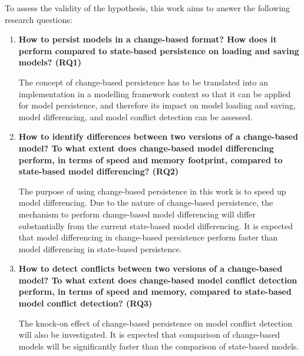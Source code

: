To assess the validity of the hypothesis, this work aims to answer the following research questions: 
\begin{enumerate} 
\item \textbf{How to persist models in a change-based format? How does it perform compared to state-based persistence on loading and saving models? (RQ1)} 

The concept of change-based persistence has to be translated into an implementation in a modelling framework context so that it can be applied for model persistence, and therefore its impact on model loading and saving, model differencing, and model conflict detection can be assessed.

\item \textbf{How to identify differences between two versions of a change-based model? To what extent does change-based model differencing perform, in terms of speed and memory footprint, compared to state-based model differencing? (RQ2)} 

The purpose of using change-based persistence in this work is to speed up model differencing. Due to the nature of change-based persistence, the mechanism to perform change-based model differencing will differ substantially from the current state-based model differencing. It is expected that model differencing in change-based persistence perform faster than model differencing in state-based persistence.        

\item \textbf{How to detect conflicts between two versions of a change-based model? To what extent does change-based model conflict detection perform, in terms of speed and memory, compared to state-based model conflict detection? (RQ3)} 

The knock-on effect of change-based persistence on model conflict detection will also be investigated. It is expected that comparison of change-based models will be significantly faster than the comparison of state-based models.

%

\end{enumerate}

